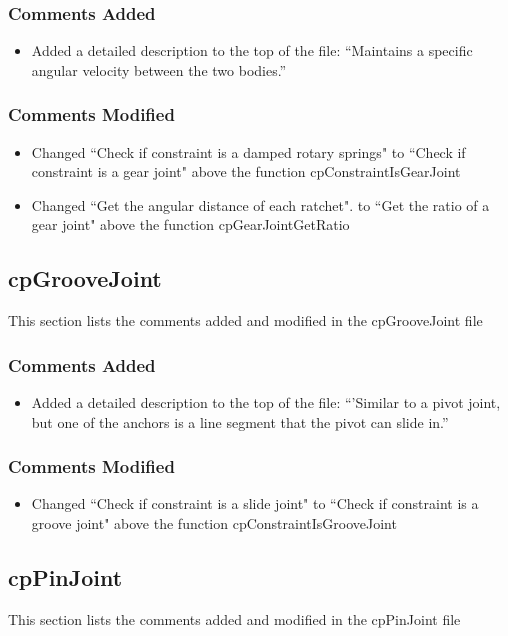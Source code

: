 \documentclass[12pt]{article}
\begin{document}
\subsubsection{Comments Added}
\begin{itemize}
\item Added a detailed description to the top of the file: ``Maintains a specific angular velocity between the two bodies.''
\end{itemize}

\subsubsection{Comments Modified}
\begin{itemize}
\item Changed ``Check if constraint is a damped rotary springs" to ``Check if constraint is a gear joint" above the function cpConstraintIsGearJoint
\item Changed ``Get the angular distance of each ratchet". to ``Get the ratio of a gear joint" above the function cpGearJointGetRatio
\end{itemize}


\subsection{cpGrooveJoint} 
This section lists the comments added and modified  in the cpGrooveJoint file

\subsubsection{Comments Added}
\begin{itemize}
\item Added a detailed description to the top of the file: ``'Similar to a pivot joint, but one of the anchors is a line segment that the pivot can slide in.''
\end{itemize}

\subsubsection{Comments Modified}
\begin{itemize}
\item Changed ``Check if constraint is a slide joint" to ``Check if constraint is a groove joint" above the function cpConstraintIsGrooveJoint
\end{itemize}


\subsection{cpPinJoint} 
This section lists the comments added and modified  in the cpPinJoint file
\end{document}
